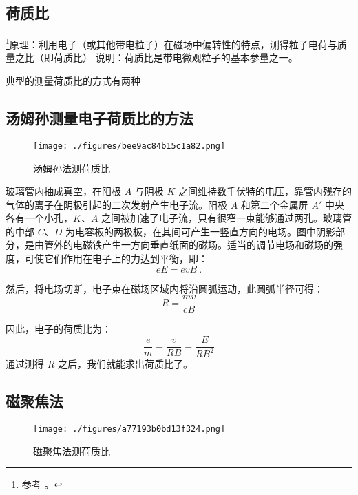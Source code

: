 

\subsection{荷质比}
\footnote{参考 \cite{新电}。}原理：利用电子（或其他带电粒子）在磁场中偏转性的特点，测得粒子电荷与质量之比（即荷质比）
说明：荷质比是带电微观粒子的基本参量之一。

典型的测量荷质比的方式有两种

\subsection{汤姆孙测量电子荷质比的方法}

\begin{figure}[ht]
\centering
\texttt{[image: ./figures/bee9ac84b15c1a82.png]}
\caption{汤姆孙法测荷质比} \label{fig_Charge_1}
\end{figure}

玻璃管内抽成真空，在阳极 $A$ 与阴极 $K$ 之间维持数千伏特的电压，靠管内残存的气体的离子在阴极引起的二次发射产生电子流。阳极 $A$ 和第二个金属屏 $A'$ 中央各有一个小孔，$K$、$A$ 之间被加速了电子流，只有很窄一束能够通过两孔。玻璃管的中部 $C$、$D$ 为电容板的两极板，在其间可产生一竖直方向的电场。图中阴影部分，是由管外的电磁铁产生一方向垂直纸面的磁场。适当的调节电场和磁场的强度，可使它们作用在电子上的力达到平衡，即：
\begin{equation}
eE=evB~.
\end{equation}

然后，将电场切断，电子束在磁场区域内将沿圆弧运动，此圆弧半径可得：
\begin{equation}
R=\frac {mv}{eB}
\end{equation}

因此，电子的荷质比为：
\begin{equation}
\frac{e}{m}=\frac{v}{RB}=\frac {E}{RB^2}
\end{equation}
通过测得 $R$ 之后，我们就能求出荷质比了。

\subsection{磁聚焦法}

\begin{figure}[ht]
\centering
\texttt{[image: ./figures/a77193b0bd13f324.png]}
\caption{磁聚焦法测荷质比} \label{fig_Charge_2}
\end{figure}

